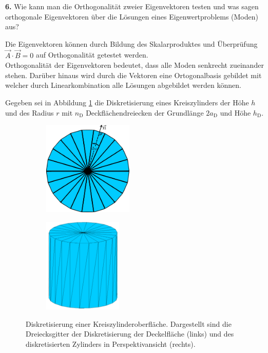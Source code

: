 \documentclass[Protokollheft.tex]{subfiles}
\begin{document}
	
	
	
	\begin{framed}
		\noindent \textbf{6.} Wie kann man die Orthogonalität zweier Eigenvektoren testen und was sagen orthogonale Eigenvektoren über die Lösungen eines Eigenwertproblems (Moden) aus?\label{exer:orthogonalEV}
	\end{framed}
	\noindent
	Die Eigenvektoren können durch Bildung des Skalarproduktes und Überprüfung $\vec{A} \cdot \vec{B} = 0$ auf Orthogonalität getestet werden. \\
	Orthogonalität der Eigenvektoren bedeutet, dass alle Moden senkrecht zueinander stehen. Darüber hinaus wird durch die Vektoren eine Ortogonalbasis gebildet mit welcher durch Linearkombination alle Lösungen abgebildet werden können. 
	
	
	
	\noindent Gegeben sei in Abbildung \ref{fig:zylGitter} die Diskretisierung eines Kreiszylinders der Höhe $h$ und des Radius $r$ mit $n_\mathrm{D}$ Deckflächendreiecken der Grundlänge $2a_\text{D}$ und Höhe $h_\text{D}$.\\
	\begin{figure}[h]
		\centering
		\begin{subfigure}{0.49\textwidth}
			\centering
			\includegraphics[height=4.5cm]{v1_zylinder1.pdf}
		\end{subfigure}
		\begin{subfigure}{0.49\textwidth}
			\centering
			\includegraphics[height=4.5cm]{v1_zylinder2.pdf}
		\end{subfigure}
		\caption{Diskretisierung einer Kreiszylinderoberfläche. Dargestellt sind die Dreiecksgitter der Diskretisierung der Deckelfläche (links) und des diskretisierten Zylinders in Perspektivansicht (rechts).}\label{fig:zylGitter}
	\end{figure}
	
\end{document}
